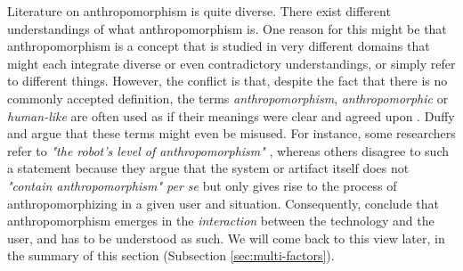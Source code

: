 \documentclass{frontiersSCNS} %
\begin{document}
Literature on anthropomorphism is quite diverse. There exist different understandings of what 
anthropomorphism is. 
One reason for this might be that anthropomorphism
is a concept that is studied in very different domains that might each
integrate diverse or even contradictory understandings, or simply refer to
different things.
However, the conflict is that, despite the fact that there is no commonly accepted
definition, the terms
\textit{anthropomorphism}, \textit{anthropomorphic} or \textit{human-like} are
often used as if their meanings were clear and agreed upon
\citep{persson_anthropomorphism_2000}. Duffy \cite{duffy_anthropomorphism_2002} and \cite{epley_when_2008}
argue that these terms might even be misused. For instance, some researchers refer to \textit{"the
robot's level of anthropomorphism"} \cite{bartneck_is_2007}, whereas others
disagree to such a statement because they argue that the system or artifact itself does not \textit{"contain anthropomorphism" per se} but only gives rise to the process of anthropomorphizing in a
given user and situation. Consequently, \cite{persson_anthropomorphism_2000} conclude that
anthropomorphism emerges in the \textit{interaction} between the technology and
the user, and has to be understood as such. 
We will come back to this view later, in the summary of this section (Subsection \ref{sec:multi-factors}). 
\end{document}
